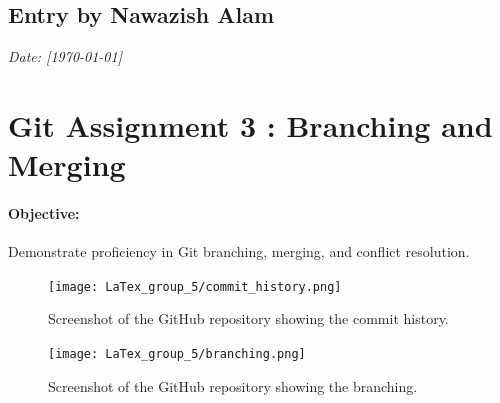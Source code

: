 \documentclass[a4paper,12pt]{article}
\begin{document}
\subsection*{Entry by Nawazish Alam}
\textit{Date: [\today]}\\
\section*{\Huge{Git Assignment 3 : Branching and Merging}}

\paragraph{Objective:} Demonstrate proficiency in Git branching, merging, and conflict resolution.

\vspace{0.5cm}

\begin{figure}[h!]
    \centering
    \texttt{[image: LaTex\_group\_5/commit\_history.png]} %
     \hspace{4 cm}
    \caption{Screenshot of the GitHub repository showing the commit history.}
\end{figure}

\begin{figure}[h!]
    \centering
    \texttt{[image: LaTex\_group\_5/branching.png]} %
     \hspace{4 cm}
    \caption{Screenshot of the GitHub repository showing the branching.}
\end{figure}
\newpage
{}
\vspace{-1.5cm}
\end{document}
